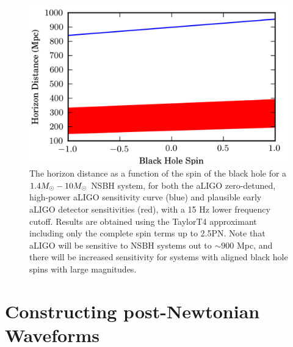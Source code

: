 \begin{figure}
\begin{center}
\includegraphics{papers/nsbh_faithfulness/figure1.png}
\end{center}
\caption{\label{fig:t4horizon} 
The horizon distance as a function of the spin of the black hole 
for a $1.4M_\odot-10M_\odot$ \ac{NSBH} system, for both the \ac{aLIGO} zero-detuned,
high-power aLIGO sensitivity curve (blue) and plausible early \ac{aLIGO}
detector sensitivities (red), with a 15 Hz lower frequency cutoff. 
Results are obtained using the TaylorT4 approximant including only the 
complete spin terms up to 2.5\ac{PN}. Note that \ac{aLIGO} will be sensitive to
\ac{NSBH} systems out to $\sim 900$ Mpc, and there will be increased sensitivity
for systems with aligned black hole spins with large magnitudes. 
}
\end{figure}

\section{Constructing post-Newtonian Waveforms}
\label{sec:waveforms}

